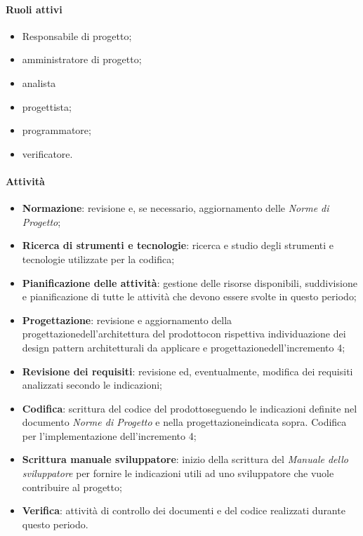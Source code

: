 \paragraph{Ruoli attivi}
\begin{itemize}
	\item Responsabile di progetto\glo;
	\item amministratore di progetto\glo;
	\item analista
	\item progettista;
	\item programmatore;
	\item verificatore.
\end{itemize}
\paragraph{Attività} 
\begin{itemize}
	\item \textbf{Normazione}: revisione e, se necessario, aggiornamento delle \textit{Norme di Progetto};
	\item \textbf{Ricerca di strumenti e tecnologie}: ricerca e studio degli strumenti e tecnologie utilizzate per la codifica;
	\item \textbf{Pianificazione delle attività}: gestione delle risorse disponibili, suddivisione e pianificazione di tutte le attività che devono essere svolte in questo periodo;
	\item \textbf{Progettazione}\glo: revisione e aggiornamento della progettazione\glosp dell'architettura del prodotto\glosp con rispettiva individuazione dei design pattern architetturali da applicare e progettazione\glosp dell'incremento 4; 
	\item \textbf{Revisione dei requisiti}: revisione ed, eventualmente, modifica dei requisiti analizzati secondo le indicazioni; 
	\item \textbf{Codifica}: scrittura del codice del prodotto\glosp seguendo le indicazioni definite nel documento \textit{Norme di Progetto} e nella progettazione\glosp indicata sopra. Codifica per l'implementazione dell'incremento 4;
	\item \textbf{Scrittura manuale sviluppatore}: inizio della scrittura del \textit{Manuale dello sviluppatore} per fornire le indicazioni utili ad uno sviluppatore che vuole contribuire al progetto\glo; 
	\item \textbf{Verifica}: attività di controllo dei documenti e del codice realizzati durante questo periodo.
\end{itemize}
